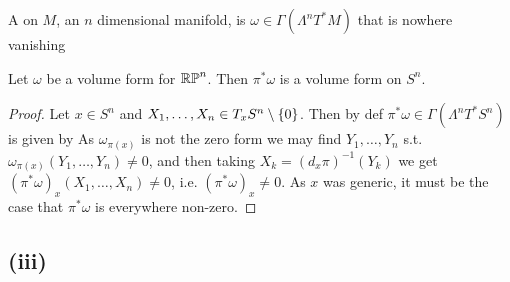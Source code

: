 \documentclass{article}
\begin{document}
\begin{definition}
A  on $M$, an $n$ dimensional manifold, is $\omega \in \Gamma(\Lambda^n T^\ast M)$ that is nowhere vanishing
\end{definition}

\begin{prop}
Let $\omega$ be a volume form for $\mathbb{RP}^n$. Then $\pi^\ast \omega$ is a volume form on $S^n$. 
\end{prop}
\begin{proof}
Let $x \in S^n$ and $X_1, \dots, X_n \in T_x S^n \setminus \left\{ 0 \right\}$. Then by def $\pi^\ast \omega \in \Gamma(\Lambda^n T^\ast S^n)$ is given by 
As $\omega_{\pi(x)}$ is not the zero form we may find $Y_1, \dots, Y_n$ s.t. $\omega_{\pi(x)}(Y_1, \dots, Y_n) \neq 0$, and then taking $X_k = (d_x\pi)^{-1}(Y_k)$ we get $(\pi^\ast \omega)_x(X_1, \dots, X_n) \neq 0$, i.e. $(\pi^\ast \omega)_x \neq 0$. As $x$ was generic, it must be the case that $\pi^\ast \omega$ is everywhere non-zero. 
\end{proof}

\subsection{(iii)}
\end{document}

